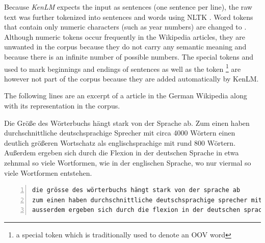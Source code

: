 Because \textit{KenLM} expects the input as sentences (one sentence per line), the raw text was further tokenized into sentences and words using NLTK \parencite{nltk}. Word tokens that contain only numeric characters (such as year numbers) are changed to . Although numeric tokens occur frequently in the Wikipedia articles, they are unwanted in the corpus because they do not carry any semantic meaning and because there is an infinite number of possible numbers. The special tokens  and  used to mark beginnings and endings of sentences as well as the  token \footnote{a special token which is traditionally used to denote an \ac{OOV} word} are however not part of the corpus because they are added automatically by KenLM.

The following lines are an excerpt of a article in the German Wikipedia along with its representation in the corpus.

\begin{displayquote}
Die Größe des Wörterbuchs hängt stark von der Sprache ab. Zum einen haben durchschnittliche deutschsprachige Sprecher mit circa 4000 Wörtern einen deutlich größeren Wortschatz als englischsprachige mit rund 800 Wörtern. Außerdem ergeben sich durch die Flexion in der deutschen Sprache in etwa zehnmal so viele Wortformen, wie in der englischen Sprache, wo nur viermal so viele Wortformen entstehen.
\end{displayquote}

\begin{lstlisting}[numbers=left, caption=Representation in corpus]
die grösse des wörterbuchs hängt stark von der sprache ab
zum einen haben durchschnittliche deutschsprachige sprecher mit circa <num> wörtern einen deutlich grösseren wortschatz als englischsprachige mit rund <num> wörtern
ausserdem ergeben sich durch die flexion in der deutschen sprache in etwa zehnmal so viele wortformen wie in der englischen sprache wo nur viermal so viele wortformen entstehen
\end{lstlisting}

